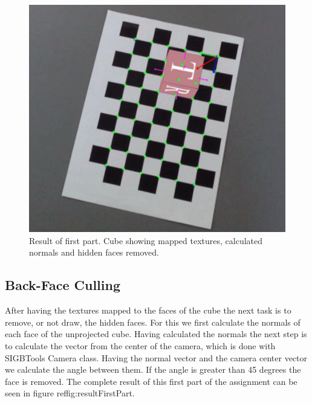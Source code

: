 \begin{figure}
	\centering
	\includegraphics[scale=0.9]{images/textureMapping.jpg}
	\caption{Result of first part. Cube showing mapped textures, calculated normals and hidden faces removed.}
	\label{fig:resultFirstPart}
\end{figure}

\subsection{Back-Face Culling}
After having the textures mapped to the faces of the cube the next task is to remove, or not draw, the hidden faces. For this we first calculate the normals of each face of the unprojected cube. Having calculated the normals the next step is to calculate the vector from the center of the camera, which is done with SIGBTools Camera class. Having the normal vector and the camera center vector we calculate the angle between them. If the angle is greater than 45 degrees the face is removed. The complete result of this first part of the assignment can be seen in figure ref{fig:resultFirstPart}.